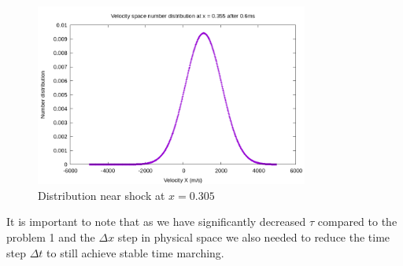 \documentclass[paper=a4, fontsize=12pt]{scrartcl}
\begin{document}
\begin{figure}[H]
        \centering
        \includegraphics[width=0.8\textwidth]{center_shock-m_4}
        \caption{Distribution near shock at $x = 0.305$ }
        \label{fig:center_shock-m_4}
\end{figure}
It is important to note that as we have significantly decreased $\tau$ compared to the
problem 1 and the $\Delta x$ step in physical space we also needed to reduce
the time step $\Delta t$ to still achieve stable time marching.
\end{document}
